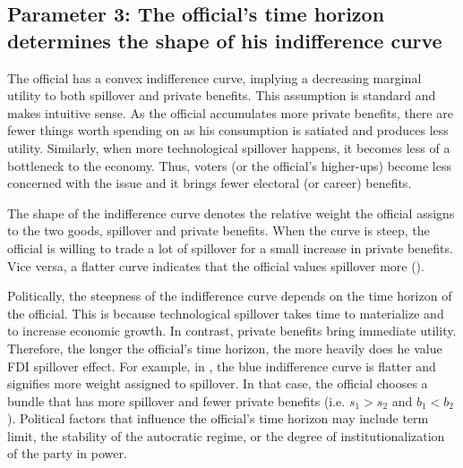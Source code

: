 \subsection{Parameter 3: The official's time horizon determines the shape of his indifference curve}
\label{sec:theory_indifference_curve}

The official has a convex indifference curve, implying a decreasing marginal utility to both spillover and private benefits. This assumption is standard and makes intuitive sense. As the official accumulates more private benefits, there are fewer things worth spending on as his consumption is satiated and produces less utility. Similarly, when more technological spillover happens, it becomes less of a bottleneck to the economy. Thus, voters (or the official's higher-ups) become less concerned with the issue and it brings fewer electoral (or career) benefits.

The shape of the indifference curve denotes the relative weight the official assigns to the two goods, spillover and private benefits. When the curve is steep, the official is willing to trade a lot of spillover for a small increase in private benefits. Vice versa, a flatter curve indicates that the official values spillover more ().

Politically, the steepness of the indifference curve depends on the time horizon of the official. This is because technological spillover takes time to materialize and to increase economic growth. In contrast, private benefits bring immediate utility. Therefore, the longer the official's time horizon, the more heavily does he value FDI spillover effect. For example, in , the blue indifference curve is flatter and signifies more weight assigned to spillover. In that case, the official chooses a bundle that has more spillover and fewer private benefits (i.e. $s_1 > s_2$ and $b_1 < b_2$). Political factors that influence the official's time horizon may include term limit, the stability of the autocratic regime, or the degree of institutionalization of the party in power. 

